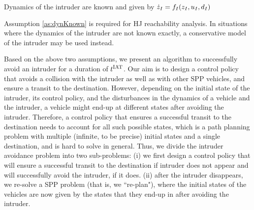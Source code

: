 \begin{assumption}
\label{as:dynKnown}
Dynamics of the intruder are known and given by $\dot{z}_I = f_I(z_I, u_I, d_I)$
\end{assumption}

Assumption \ref{as:dynKnown} is required for HJ reachability analysis. In situations where the dynamics of the intruder are not known exactly, a conservative model of the intruder may be used instead.

Based on the above two assumptions, we present an algorithm to successfully avoid an intruder for a duration of $t^\text{IAT}$. Our aim is to design a control policy that avoids a collision with the intruder as well as with other SPP vehicles, and ensure a transit to the destination. However, depending on the initial state of the intruder, its control policy, and the disturbances in the dynamics of a vehicle and the intruder, a vehicle might end-up at different states after avoiding the intruder. Therefore, a control policy that ensures a successful transit to the destination needs to account for all such possible states, which is a path planning problem with multiple (infinite, to be precise) initial states and a single destination, and is hard to solve in general. Thus, we divide the intruder avoidance problem into two sub-problems: (i) we first design a control policy that will ensure a successful transit to the destination if intruder does not appear and will successfully avoid the intruder, if it does. (ii) after the intruder disappears, we re-solve a SPP problem (that is, we ``re-plan"), where the initial states of the vehicles are now given by the states that they end-up in after avoiding the intruder. 

